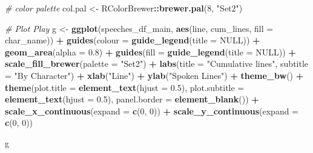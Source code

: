 \documentclass[]{article}
\newenvironment{Shaded}{\begin{snugshade}}{\end{snugshade}}
\newcommand{\CommentTok}[1]{\textcolor[rgb]{0.56,0.35,0.01}{\textit{#1}}}
\newcommand{\DataTypeTok}[1]{\textcolor[rgb]{0.13,0.29,0.53}{#1}}
\newcommand{\DecValTok}[1]{\textcolor[rgb]{0.00,0.00,0.81}{#1}}
\newcommand{\FloatTok}[1]{\textcolor[rgb]{0.00,0.00,0.81}{#1}}
\newcommand{\KeywordTok}[1]{\textcolor[rgb]{0.13,0.29,0.53}{\textbf{#1}}}
\newcommand{\NormalTok}[1]{#1}
\newcommand{\OperatorTok}[1]{\textcolor[rgb]{0.81,0.36,0.00}{\textbf{#1}}}
\newcommand{\OtherTok}[1]{\textcolor[rgb]{0.56,0.35,0.01}{#1}}
\newcommand{\StringTok}[1]{\textcolor[rgb]{0.31,0.60,0.02}{#1}}
\begin{document}
\begin{Shaded}
\begin{Highlighting}[]
\CommentTok{# color palette}
\NormalTok{col.pal <-}\StringTok{ }\NormalTok{RColorBrewer}\OperatorTok{::}\KeywordTok{brewer.pal}\NormalTok{(}\DecValTok{8}\NormalTok{, }\StringTok{"Set2"}\NormalTok{)}

\CommentTok{# Plot Play}
\NormalTok{g <-}\StringTok{ }\KeywordTok{ggplot}\NormalTok{(speeches_df_main, }\KeywordTok{aes}\NormalTok{(line, cum_lines, }\DataTypeTok{fill =}\NormalTok{ char_name)) }\OperatorTok{+}\StringTok{ }
\StringTok{  }\KeywordTok{guides}\NormalTok{(}\DataTypeTok{colour =} \KeywordTok{guide_legend}\NormalTok{(}\DataTypeTok{title =} \OtherTok{NULL}\NormalTok{)) }\OperatorTok{+}
\StringTok{  }\KeywordTok{geom_area}\NormalTok{(}\DataTypeTok{alpha =} \FloatTok{0.8}\NormalTok{) }\OperatorTok{+}\StringTok{ }
\StringTok{  }\KeywordTok{guides}\NormalTok{(}\DataTypeTok{fill =} \KeywordTok{guide_legend}\NormalTok{(}\DataTypeTok{title =} \OtherTok{NULL}\NormalTok{)) }\OperatorTok{+}
\StringTok{  }\KeywordTok{scale_fill_brewer}\NormalTok{(}\DataTypeTok{palette =} \StringTok{"Set2"}\NormalTok{) }\OperatorTok{+}\StringTok{ }
\StringTok{  }\KeywordTok{labs}\NormalTok{(}\DataTypeTok{title =} \StringTok{"Cumulative lines"}\NormalTok{, }\DataTypeTok{subtitle =} \StringTok{"By Character"}\NormalTok{) }\OperatorTok{+}\StringTok{ }
\StringTok{  }\KeywordTok{xlab}\NormalTok{(}\StringTok{"Line"}\NormalTok{) }\OperatorTok{+}\StringTok{ }
\StringTok{  }\KeywordTok{ylab}\NormalTok{(}\StringTok{"Spoken Lines"}\NormalTok{) }\OperatorTok{+}
\StringTok{  }\KeywordTok{theme_bw}\NormalTok{() }\OperatorTok{+}\StringTok{ }
\StringTok{  }\KeywordTok{theme}\NormalTok{(}\DataTypeTok{plot.title =} \KeywordTok{element_text}\NormalTok{(}\DataTypeTok{hjust =} \FloatTok{0.5}\NormalTok{),}
        \DataTypeTok{plot.subtitle =} \KeywordTok{element_text}\NormalTok{(}\DataTypeTok{hjust =} \FloatTok{0.5}\NormalTok{),}
        \DataTypeTok{panel.border =} \KeywordTok{element_blank}\NormalTok{()) }\OperatorTok{+}
\StringTok{  }\KeywordTok{scale_x_continuous}\NormalTok{(}\DataTypeTok{expand =} \KeywordTok{c}\NormalTok{(}\DecValTok{0}\NormalTok{, }\DecValTok{0}\NormalTok{)) }\OperatorTok{+}\StringTok{ }
\StringTok{  }\KeywordTok{scale_y_continuous}\NormalTok{(}\DataTypeTok{expand =} \KeywordTok{c}\NormalTok{(}\DecValTok{0}\NormalTok{, }\DecValTok{0}\NormalTok{))}

\NormalTok{g}
\end{Highlighting}
\end{Shaded}
\end{document}

